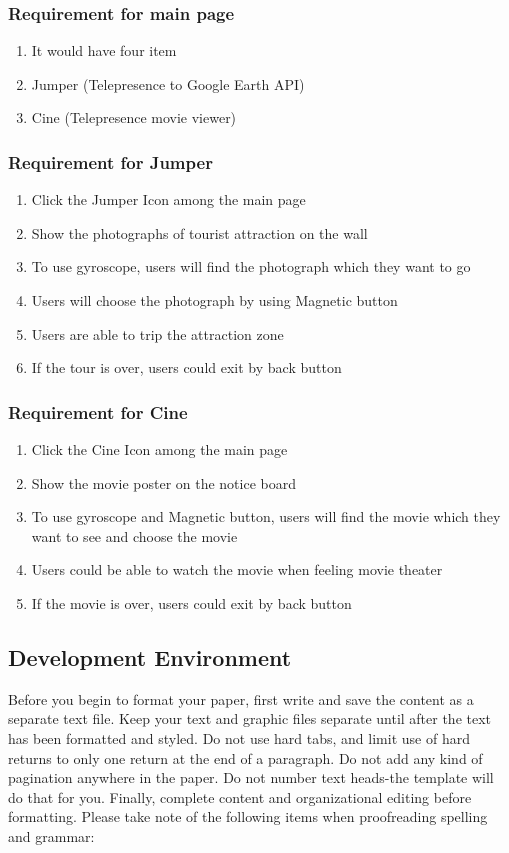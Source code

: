 \documentclass[12pt]{article}
\begin{document}
\subsubsection{Requirement for main page}
\begin{enumerate}
\item It would have four item
\item Jumper (Telepresence to Google Earth API)
\item Cine (Telepresence movie viewer)
\end{enumerate}

\subsubsection{Requirement for Jumper}
\begin{enumerate}
\item Click the Jumper Icon among the main page
\item Show the photographs of tourist attraction on the wall
\item To use gyroscope, users will  find the photograph which they want to go
\item Users will choose the photograph by using Magnetic button
\item Users are able to trip the attraction zone
\item If the tour is over, users could exit by back button
\end{enumerate}

\subsubsection{Requirement for Cine}
\begin{enumerate}
\item Click the Cine Icon among the main page
\item Show the movie poster on the notice board
\item To use gyroscope and Magnetic button, users will find the movie which they want to see and choose the movie
\item Users could be able to watch the movie when feeling movie theater
\item If the movie is over, users could exit by back button
\end{enumerate}

\subsection{Development Environment}
Before you begin to format your paper, first write and save the content as a separate text file. Keep your text and graphic files separate until after the text has been formatted and styled. Do not use hard tabs, and limit use of hard returns to only one return at the end of a paragraph. Do not add any kind of pagination anywhere in the paper. Do not number text heads-the template will do that for you.
Finally, complete content and organizational editing before formatting. Please take note of the following items when proofreading spelling and grammar:
\end{document}
